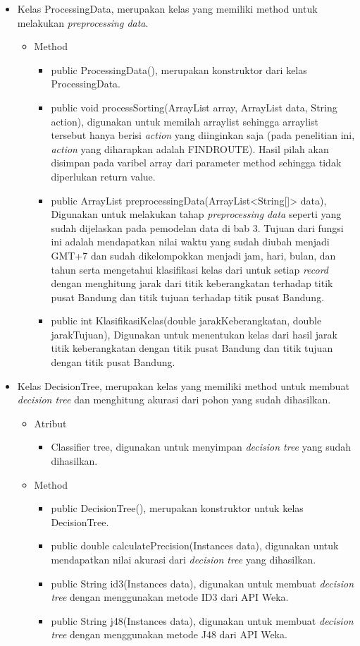 \begin{itemize}
	\item Kelas ProcessingData, merupakan kelas yang memiliki method untuk melakukan \textsl{preprocessing data}.
	\begin{itemize}
		\item Method
		\begin{itemize}
			\item public ProcessingData(), merupakan konstruktor dari kelas ProcessingData.
			\item public void processSorting(ArrayList array, ArrayList data, String action), digunakan untuk memilah arraylist sehingga arraylist tersebut hanya berisi \textsl{action} yang diinginkan saja (pada penelitian ini, \textsl{action} yang diharapkan adalah FINDROUTE). Hasil pilah akan disimpan pada varibel array dari parameter method sehingga tidak diperlukan return value.
			\item public ArrayList preprocessingData(ArrayList<String[]> data), Digunakan untuk melakukan tahap \textsl{preprocessing data} seperti yang sudah dijelaskan pada pemodelan data di bab 3. Tujuan dari fungsi ini adalah mendapatkan nilai waktu yang sudah diubah menjadi GMT+7 dan sudah dikelompokkan menjadi jam, hari, bulan, dan tahun serta mengetahui klasifikasi kelas dari untuk setiap \textsl{record} dengan menghitung jarak dari titik keberangkatan terhadap titik pusat Bandung dan titik tujuan terhadap titik pusat Bandung.
			\item public int KlasifikasiKelas(double jarakKeberangkatan, double jarakTujuan), Digunakan untuk menentukan kelas dari hasil jarak titik keberangkatan dengan titik pusat Bandung dan titik tujuan dengan titik pusat Bandung. 
		\end{itemize}
	\end{itemize}

	\item Kelas DecisionTree, merupakan kelas yang memiliki method untuk membuat \textsl{decision tree} dan menghitung akurasi dari pohon yang sudah dihasilkan.
	\begin{itemize}
		\item Atribut
		\begin{itemize}
			\item Classifier tree, digunakan untuk menyimpan \textsl{decision tree} yang sudah dihasilkan.
		\end{itemize}
		\item Method
		\begin{itemize}
			\item public DecisionTree(), merupakan konstruktor untuk kelas DecisionTree.
			\item public double calculatePrecision(Instances data), digunakan untuk mendapatkan nilai akurasi dari \textsl{decision tree} yang dihasilkan.
			\item public String id3(Instances data), digunakan untuk membuat \textsl{decision tree} dengan menggunakan metode ID3 dari API Weka.
			\item public String j48(Instances data), digunakan untuk membuat \textsl{decision tree} dengan menggunakan metode J48 dari API Weka.
		\end{itemize}
	\end{itemize}


\end{itemize}
